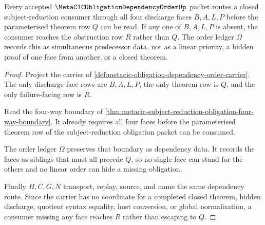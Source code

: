 \begin{theorem}
\label{thm:metacic-obligation-dependency-order-nonescape}
Every accepted $\MetaCICObligationDependencyOrderUp$ packet routes a closed subject-reduction consumer through all four discharge faces $B,A,L,P$ before the parameterised theorem row $Q$ can be read. If any one of $B,A,L,P$ is absent, the consumer reaches the obstruction row $R$ rather than $Q$. The order ledger $\Omega$ records this as simultaneous predecessor data, not as a linear priority, a hidden proof of one face from another, or a closed theorem.
\end{theorem}
\begin{proof}
Project the carrier of \autoref{def:metacic-obligation-dependency-order-carrier}. The only discharge-face rows are $B,A,L,P$, the only theorem row is $Q$, and the only failure-facing row is $R$.

Read the four-way boundary of \autoref{thm:metacic-subject-reduction-obligation-four-way-boundary}. It already requires all four faces before the parameterised theorem row of the subject-reduction obligation packet can be consumed.

The order ledger $\Omega$ preserves that boundary as dependency data. It records the faces as siblings that must all precede $Q$, so no single face can stand for the others and no linear order can hide a missing obligation.

Finally $H,C,G,N$ transport, replay, source, and name the same dependency route. Since the carrier has no coordinate for a completed closed theorem, hidden discharge, quotient syntax equality, host conversion, or global normalization, a consumer missing any face reaches $R$ rather than escaping to $Q$.
\end{proof}




